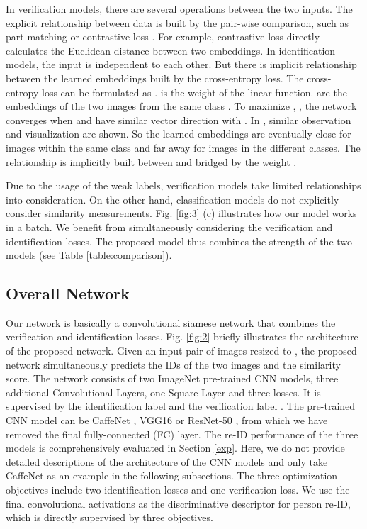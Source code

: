 \documentclass[journal]{IEEEtran}
\begin{document}
In verification models, there are several operations between the two inputs. The explicit relationship between data is built by the pair-wise comparison, such as part matching \cite{li2014deepreid,ahmed2015improved} or contrastive loss \cite{hadsell2006dimensionality}. For example, contrastive loss directly calculates the Euclidean distance between two embeddings. In identification models, the input is independent to each other. But there is implicit relationship between the learned embeddings built by the cross-entropy loss. The cross-entropy loss can be formulated as .  is the weight of the linear function.  are the embeddings of the two images  from the same class .  To maximize , , the network converges when  and  have similar vector direction with . In \cite{liu2016large}, similar observation and visualization are shown. So the learned embeddings are eventually close for images within the same class and far away for images in  the different classes. The relationship is implicitly built between  and bridged by the weight .

Due to the usage of the weak labels, verification models take limited relationships into consideration. On the other hand, classification models do not explicitly consider similarity measurements. Fig. \ref{fig:3} (c) illustrates how our model works in a batch. We benefit from simultaneously considering the verification and identification losses. The proposed model thus combines the strength of the two models (see Table \ref{table:comparison}).

\subsection{Overall Network}
Our network is basically a convolutional siamese network that combines the verification and identification losses. Fig. \ref{fig:2} briefly illustrates the architecture of the proposed network. Given an input pair of images resized to , the proposed network simultaneously predicts the IDs of the two images and the similarity score. The network consists of two ImageNet \cite{russakovsky2015imagenet} pre-trained CNN models, three additional Convolutional Layers, one Square Layer and three losses. It is supervised by the identification label  and the verification label . The pre-trained CNN model can be CaffeNet \cite{krizhevsky2012imagenet}, VGG16 \cite{simonyan2014very} or ResNet-50 \cite{he2016deep}, from which we have removed the final fully-connected (FC) layer. The re-ID performance of the three models is comprehensively evaluated in Section \ref{exp}. Here, we do not provide detailed descriptions of the architecture of the CNN models and only take CaffeNet as an example in the following subsections. The three optimization objectives include two identification losses and one verification loss. We use the final convolutional activations  as the discriminative descriptor for person re-ID, which is directly supervised by three objectives.
\end{document}
